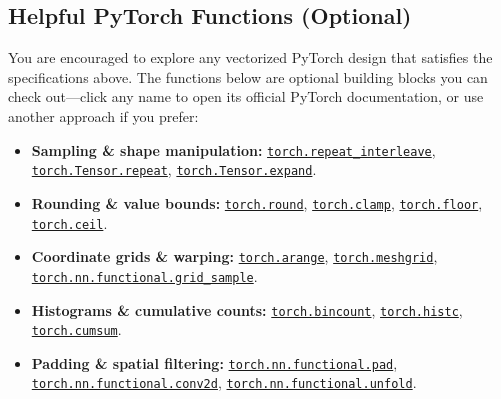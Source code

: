 \documentclass[11pt,letterpaper]{article}
\newcommand{\codelink}[2]{\href{#1}{\texttt{#2}}}
\begin{document}
\subsection{Helpful PyTorch Functions (Optional)}
You are encouraged to explore any vectorized PyTorch design that satisfies the specifications above. The functions below are optional building blocks you can check out---click any name to open its official PyTorch documentation, or use another approach if you prefer:
\begin{itemize}\raggedright
  \item \textbf{Sampling \& shape manipulation:}
        \codelink{https://docs.pytorch.org/docs/stable/generated/torch.repeat_interleave.html}{torch.repeat\_interleave},
        \codelink{https://docs.pytorch.org/docs/stable/generated/torch.Tensor.repeat.html}{torch.Tensor.repeat},
        \codelink{https://docs.pytorch.org/docs/stable/generated/torch.Tensor.expand.html}{torch.Tensor.expand}.
  \item \textbf{Rounding \& value bounds:}
        \codelink{https://docs.pytorch.org/docs/stable/generated/torch.round.html}{torch.round},
        \codelink{https://docs.pytorch.org/docs/stable/generated/torch.clamp.html}{torch.clamp},
        \codelink{https://docs.pytorch.org/docs/stable/generated/torch.floor.html}{torch.floor},
        \codelink{https://docs.pytorch.org/docs/stable/generated/torch.ceil.html}{torch.ceil}.
  \item \textbf{Coordinate grids \& warping:}
        \codelink{https://docs.pytorch.org/docs/stable/generated/torch.arange.html}{torch.arange},
        \codelink{https://docs.pytorch.org/docs/stable/generated/torch.meshgrid.html}{torch.meshgrid},
        \codelink{https://docs.pytorch.org/docs/stable/generated/torch.nn.functional.grid_sample.html}{torch.nn.functional.grid\_sample}.
  \item \textbf{Histograms \& cumulative counts:}
        \codelink{https://docs.pytorch.org/docs/stable/generated/torch.bincount.html}{torch.bincount},
        \codelink{https://docs.pytorch.org/docs/stable/generated/torch.histc.html}{torch.histc},
        \codelink{https://docs.pytorch.org/docs/stable/generated/torch.cumsum.html}{torch.cumsum}.
  \item \textbf{Padding \& spatial filtering:}
        \codelink{https://docs.pytorch.org/docs/stable/generated/torch.nn.functional.pad.html}{torch.nn.functional.pad},
        \codelink{https://docs.pytorch.org/docs/stable/generated/torch.nn.functional.conv2d.html}{torch.nn.functional.conv2d},
        \codelink{https://docs.pytorch.org/docs/stable/generated/torch.nn.functional.unfold.html}{torch.nn.functional.unfold}.
\end{itemize}
\end{document}
